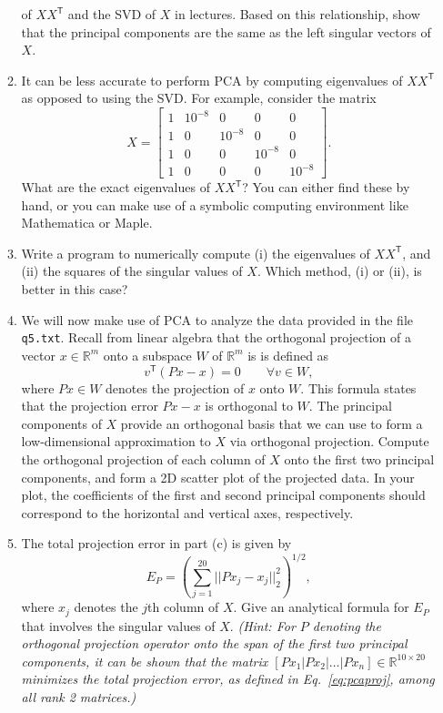 \documentclass[11pt]{article}
\newcommand{\R}{\mathbb{R}}
\newcommand{\Trans}{\mathsf{T}}
\begin{document}
\begin{enumerate}
\begin{enumerate}
	of $XX^\Trans$ and the SVD of $X$ in lectures. Based on this
	relationship, show that the principal components are the same as the
	left singular vectors of $X$.
      \item It can be less accurate to perform PCA by computing eigenvalues of
	$XX^\Trans$ as opposed to using the SVD. For example, consider the
	matrix
	\begin{equation}
	  X =
	  \left[
	  \begin{array}{ccccc}
	    1 & 10^{-8} & 0 & 0 & 0 \\
	    1 & 0 & 10^{-8} & 0 & 0 \\
	    1 & 0 & 0 & 10^{-8} & 0 \\
	    1 & 0 & 0 & 0 & 10^{-8}
	  \end{array}
	  \right].
	\end{equation}
	What are the exact eigenvalues of $XX^\Trans$? You can either find
	these by hand, or you can make use of a symbolic computing environment
	like Mathematica or Maple.
      \item Write a program to numerically compute (i) the eigenvalues of
	$XX^\Trans$, and (ii) the squares of the singular values of $X$.
	Which method, (i) or (ii), is better in this case?
      \item We will now make use of PCA to analyze the data provided in the file \texttt{q5.txt}. Recall from linear algebra that the orthogonal projection of a vector $x \in \R^m$ onto a subspace $W$ of $\R^m$ is is defined as
	\begin{equation}
	  v^\Trans(Px-x) = 0 \qquad \forall v \in W,
	\end{equation}
	where $Px \in W$ denotes the projection of $x$ onto $W$. This formula
	states that the projection error $Px - x$ is orthogonal to $W$. The
	principal components of $X$ provide an orthogonal basis that we can use
	to form a low-dimensional approximation to $X$ via orthogonal
	projection. Compute the orthogonal projection of each column of $X$
	onto the first two principal components, and form a 2D scatter plot of
	the projected data. In your plot, the coefficients of the first and
	second principal components should correspond to the horizontal and
	vertical axes, respectively.
      \item The total projection error in part (c) is given by
	\begin{equation}
	  E_P = \left( \sum_{j=1}^{20} ||Px_j - x_j||_2^2 \right)^{1/2},
	  \label{eq:pcaproj}
	\end{equation}
	where $x_j$ denotes the $j$th column of $X$. Give an analytical formula
	for $E_P$ that involves the singular values of $X$. {\it (Hint: For $P$
	denoting the orthogonal projection operator onto the span of the first
	two principal components, it can be shown that the matrix $[Px_1 | Px_2
	| \dots | Px_n] \in \R^{10\times20}$ minimizes the total projection
	error, as defined in Eq.~\ref{eq:pcaproj}, among all rank 2 matrices.)}


\end{enumerate}
\end{enumerate}
\end{document}
